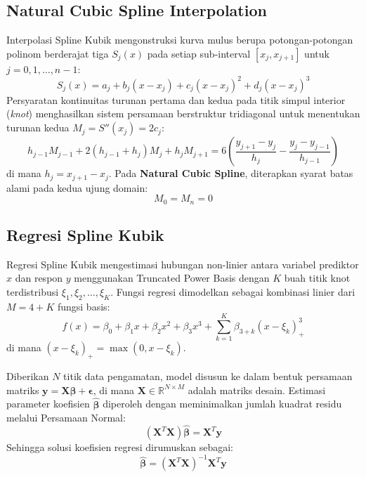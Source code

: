 \documentclass[12pt]{article}
\begin{document}
\begin{enumerate}
\subsection{Natural Cubic Spline Interpolation}
Interpolasi Spline Kubik mengonstruksi kurva mulus berupa potongan-potongan polinom berderajat tiga $S_j(x)$ pada setiap sub-interval $[x_j, x_{j+1}]$ untuk $j = 0, 1, \dots, n-1$:
\begin{equation}
    S_j(x) = a_j + b_j(x - x_j) + c_j(x - x_j)^2 + d_j(x - x_j)^3
\end{equation}
Persyaratan kontinuitas turunan pertama dan kedua pada titik simpul interior (\textit{knot}) menghasilkan sistem persamaan berstruktur tridiagonal untuk menentukan turunan kedua $M_j = S''(x_j) = 2c_j$:
\begin{equation}
    h_{j-1} M_{j-1} + 2(h_{j-1} + h_j) M_j + h_j M_{j+1} = 6 \left( \frac{y_{j+1} - y_j}{h_j} - \frac{y_j - y_{j-1}}{h_{j-1}} \right)
\end{equation}
di mana $h_j = x_{j+1} - x_j$. Pada \textbf{Natural Cubic Spline}, diterapkan syarat batas alami pada kedua ujung domain:
\begin{equation}
    M_0 = M_n = 0
\end{equation}

\subsection{Regresi Spline Kubik}
Regresi Spline Kubik mengestimasi hubungan non-linier antara variabel prediktor $x$ dan respon $y$ menggunakan Truncated Power Basis dengan $K$ buah titik knot terdistribusi $\xi_1, \xi_2, \dots, \xi_K$. Fungsi regresi dimodelkan sebagai kombinasi linier dari $M = 4 + K$ fungsi basis:
\begin{equation}
    f(x) = \beta_0 + \beta_1 x + \beta_2 x^2 + \beta_3 x^3 + \sum_{k=1}^{K} \beta_{3+k} (x - \xi_k)_+^3
\end{equation}
di mana $(x - \xi_k)_+ = \max(0, x - \xi_k)$.

Diberikan $N$ titik data pengamatan, model disusun ke dalam bentuk persamaan matriks $\mathbf{y} = \mathbf{X}\boldsymbol{\beta} + \boldsymbol{\epsilon}$, di mana $\mathbf{X} \in \mathbb{R}^{N \times M}$ adalah matriks desain. Estimasi parameter koefisien $\hat{\boldsymbol{\beta}}$ diperoleh dengan meminimalkan jumlah kuadrat residu melalui Persamaan Normal:
\begin{equation}
    (\mathbf{X}^T\mathbf{X})\hat{\boldsymbol{\beta}} = \mathbf{X}^T\mathbf{y}
\end{equation}
Sehingga solusi koefisien regresi dirumuskan sebagai:
\begin{equation}
    \hat{\boldsymbol{\beta}} = (\mathbf{X}^T\mathbf{X})^{-1}\mathbf{X}^T\mathbf{y}
\end{equation}


\end{enumerate}
\end{document}
